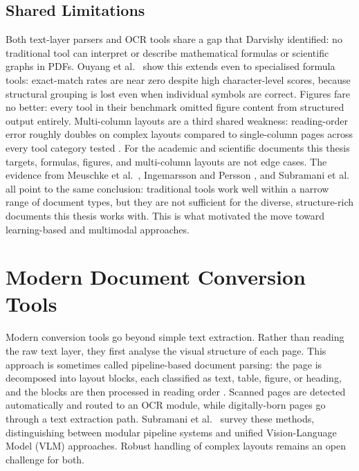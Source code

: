 \subsection{Shared Limitations}

Both text-layer parsers and OCR tools share a gap that Darvishy
\autocite{darvishy2018} identified: no traditional tool can interpret or describe
mathematical formulas or scientific graphs in PDFs. Ouyang et al.\
\autocite{omnidocbench2025} show this extends even to specialised formula tools:
exact-match rates are near zero despite high character-level scores, because
structural grouping is lost even when individual symbols are correct. Figures
fare no better: every tool in their benchmark omitted figure content from
structured output entirely. Multi-column layouts are a third shared weakness:
reading-order error roughly doubles on complex layouts compared to single-column
pages across every tool category tested \autocite{omnidocbench2025}. For the
academic and scientific documents this thesis targets, formulas, figures, and
multi-column layouts are not edge cases. The evidence
from Meuschke et al.\ \autocite{meuschke2023}, Ingemarsson and Persson
\autocite{ingemarsson2024}, and Subramani et al.\ \autocite{subramani2020} all point
to the same conclusion: traditional tools work well within a narrow range of
document types, but they are not sufficient for the diverse, structure-rich
documents this thesis works with. This is what motivated the move toward
learning-based and multimodal approaches.

\section{Modern Document Conversion Tools}

Modern conversion tools go beyond simple text extraction. Rather than reading the
raw text layer, they first analyse the visual structure of each page. This approach
is sometimes called pipeline-based document parsing: the page is decomposed into
layout blocks, each classified as text, table, figure, or heading, and the blocks
are then processed in reading order \autocite{whitington2012}. Scanned pages are detected
automatically and routed to an OCR module, while digitally-born pages go through a
text extraction path. Subramani et al.\ \autocite{subramani2020} survey these methods,
distinguishing between modular pipeline systems and unified Vision-Language Model
(VLM) approaches. Robust handling of complex layouts remains an open challenge
for both.

